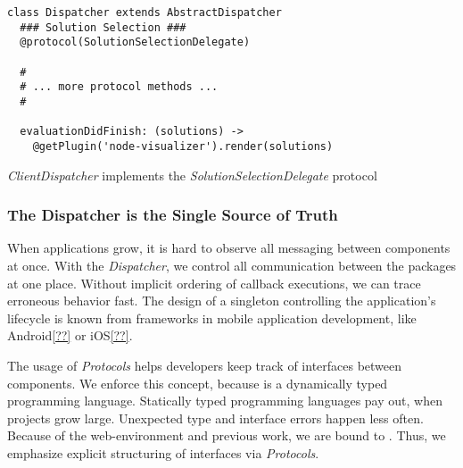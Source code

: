 \documentclass[../ClassicThesis.tex]{subfiles}
\begin{document}
\begin{listing}[!h]
\begin{verbatim}
class Dispatcher extends AbstractDispatcher
  ### Solution Selection ###
  @protocol(SolutionSelectionDelegate)

  #
  # ... more protocol methods ...
  #

  evaluationDidFinish: (solutions) ->
    @getPlugin('node-visualizer').render(solutions)
\end{verbatim}
\caption{\emph{ClientDispatcher} implements the \emph{SolutionSelectionDelegate}
  protocol}
\label{lst:client_dispatcher_protocol}
\end{listing}



\subsubsection{The Dispatcher is the Single Source of Truth}
\label{sec:disp-single-source}

When applications grow, it is hard to observe all messaging between
components at once. With the \emph{Dispatcher}, we control all
communication between the packages at one place. Without implicit
ordering of callback executions, we can trace erroneous behavior
fast. The design of a singleton controlling the application's
lifecycle is known from frameworks in mobile application
development, like Android\ref{??} or iOS\ref{??}.

The usage of \emph{Protocols} helps developers keep track of
interfaces between components. We enforce this concept, because
\javascript is a dynamically typed programming language. Statically
typed programming languages pay out, when projects grow large.
Unexpected type and interface errors happen less often. Because of
the web-environment and previous work, we are bound to
\coffeescript. Thus, we emphasize explicit structuring of interfaces
via \emph{Protocols}.
\end{document}
